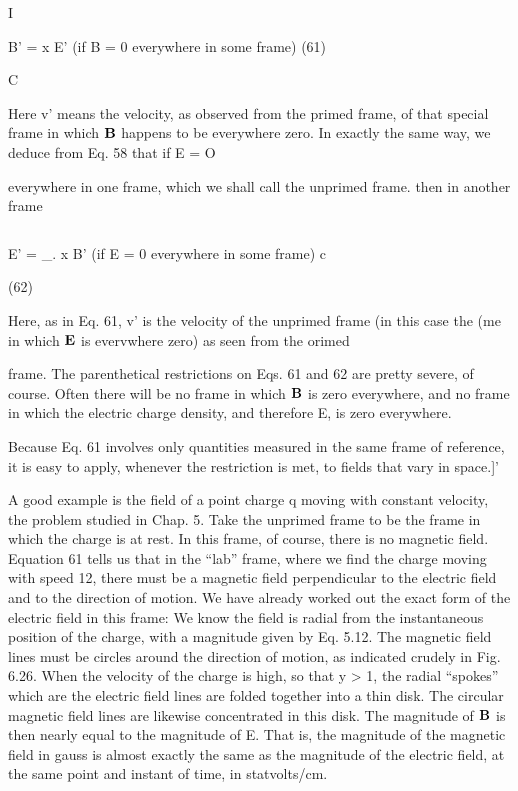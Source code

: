   

I

B' =  x E' (if B = 0 everywhere in some frame) (61)

C

 

Here v' means the velocity, as observed from the primed frame, of
that special frame in which $\mathbf{B}$ happens to be everywhere zero.
In exactly the same way, we deduce from Eq. 58 that if E = O

everywhere in one frame, which we shall call the unprimed frame.
then in another frame

 
   
\begin{equation}
\end{equation}

  
 

E' = _.  x B' (if E = 0 everywhere in some frame)
c

(62)

 

Here, as in Eq. 61, v' is the velocity of the unprimed frame (in this
case the (me in which $\mathbf{E}$ is evervwhere zero) as seen from the orimed

frame. The parenthetical restrictions on Eqs. 61 and 62 are pretty
severe, of course. Often there will be no frame in which $\mathbf{B}$ is zero
everywhere, and no frame in which the electric charge density, and
therefore E, is zero everywhere.

Because Eq. 61 involves only quantities measured in the same
frame of reference, it is easy to apply, whenever the restriction is
met, to fields that vary in space.]'

A good example is the field of a point charge q moving with constant
velocity, the problem studied in Chap. 5. Take the unprimed
frame to be the frame in which the charge is at rest. In this frame,
of course, there is no magnetic field. Equation 61 tells us that in the
``lab'' frame, where we find the charge moving with speed 12, there
must be a magnetic field perpendicular to the electric field and to the
direction of motion. We have already worked out the exact form of
the electric field in this frame: We know the field is radial from the
instantaneous position of the charge, with a magnitude given by
Eq. 5.12. The magnetic field lines must be circles around the direction
of motion, as indicated crudely in Fig. 6.26. When the velocity
of the charge is high, so that y > 1, the radial ``spokes'' which are the
electric field lines are folded together into a thin disk. The circular
magnetic field lines are likewise concentrated in this disk. The magnitude
of $\mathbf{B}$ is then nearly equal to the magnitude of E. That is, the
magnitude of the magnetic field in gauss is almost exactly the same
as the magnitude of the electric field, at the same point and instant
of time, in statvolts/cm.

